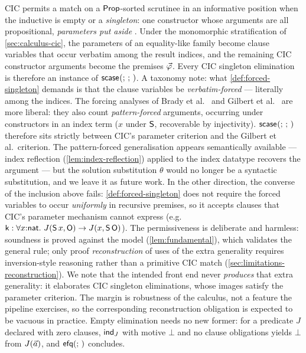 \begin{remark}
\label{rem:singleton-criterion}
CIC permits a match on a $\mathsf{Prop}$-sorted scrutinee in an informative
position when the inductive is empty or a \emph{singleton}: one
constructor whose arguments are all propositional, \emph{parameters put
aside} \cite{Rocq,Letouzey2003}.  Under the monomorphic stratification of
\cref{sec:calculus-cic}, the parameters of an equality-like family become
clause variables that occur verbatim among the result indices, and the
remaining CIC constructor arguments become the premises
$\vec{\varphi}$.  Every CIC singleton elimination is therefore an
instance of $\mathsf{scase}_{}(;\,;\,)$.  A taxonomy note: what
\cref{def:forced-singleton} demands is that the clause variables be
\emph{verbatim-forced} --- literally among the indices.  The forcing
analyses of Brady et al.\ \cite{BradyEtAl2004} and Gilbert et al.\
\cite{GilbertEtAl2019} are more liberal: they also count
\emph{pattern-forced} arguments, occurring under constructors in an
index term ($x$ under $\mathsf{S}$, recoverable by injectivity).
$\mathsf{scase}_{}(;\,;\,)$ therefore sits strictly between CIC's parameter
criterion and the Gilbert et al.\ criterion.  The pattern-forced
generalisation appears semantically available --- index reflection
(\cref{lem:index-reflection}) applied to the index datatype recovers
the argument --- but the solution substitution $\theta$ would no
longer be a syntactic substitution, and we leave it as future work.
In the other direction, the converse of the inclusion above fails:
\cref{def:forced-singleton} does not require the forced variables
to occur \emph{uniformly} in recursive premises, so it accepts clauses
that CIC's parameter mechanism cannot express (e.g.\ $\mathsf{k} : \forall
x{:}\mathsf{nat}.\ J(\mathsf{S}\,x, \mathsf{O}) \to J(x, \mathsf{S}\,\mathsf{O})$).  The permissiveness
is deliberate and harmless: soundness is proved against the model
(\cref{lem:fundamental}), which validates the general rule; only proof
\emph{reconstruction} of uses of the extra generality requires
inversion-style reasoning rather than a primitive CIC match
(\cref{sec:limitations-reconstruction}).  We note that the intended
front end never \emph{produces} that extra generality: it elaborates
CIC singleton eliminations, whose images satisfy the parameter
criterion.  The margin is robustness of the calculus, not a feature
the pipeline exercises, so the corresponding reconstruction
obligation is expected to be vacuous in practice.  Empty elimination needs no new
former: for a predicate $J$ declared with zero clauses, $\mathsf{ind}_{J}$ with
motive $\bot$ and no clause obligations yields $\bot$ from $J(\vec{a})$,
and $\mathsf{efq}(;\,)$ concludes.
\end{remark}


